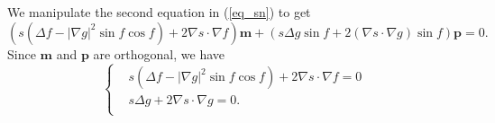 \documentclass[10pt, a4paper]{article}
\newcommand\n{\mathbf{n}}
\newcommand\m{\mathbf{m}}
\newcommand\p{\mathbf{p}}
\newcommand\Qvec{\mathbf{Q}}
\newcommand\pp{\partial}
\begin{document}
We manipulate the second equation in  (\ref{eq_sn}) to get 
%
%
\begin{equation}
\left( s (\Delta f - |\nabla g|^2 \sin f \cos f ) + 2 \nabla s \cdot \nabla f  \right) \m + \left( s \Delta g \sin f + 2 ( \nabla s \cdot \nabla g) \sin f \right) \p = 0.
\end{equation}
Since $\m$ and $\p$ are orthogonal, we have
\begin{equation}
\begin{cases}
& s (\Delta f - |\nabla g|^2 \sin f \cos f ) + 2 \nabla s \cdot \nabla f = 0 \\
& s \Delta g + 2 \nabla s \cdot \nabla g  = 0. \\
\end{cases}
\end{equation}


\end{document}
